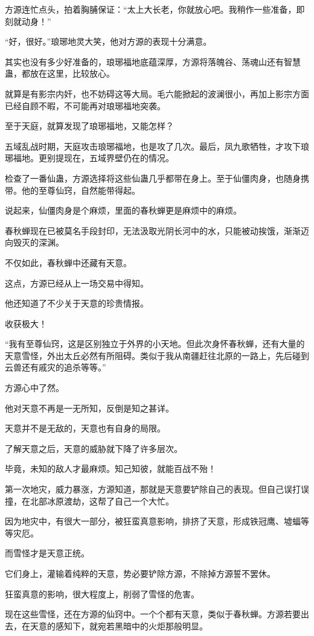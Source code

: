 \begin{this_body}
方源连忙点头，拍着胸脯保证：“太上大长老，你就放心吧。我稍作一些准备，即刻就动身！”

“好，很好。”琅琊地灵大笑，他对方源的表现十分满意。

其实也没有多少好准备的，琅琊福地底蕴深厚，方源将落魄谷、荡魂山还有智慧蛊，都放在这里，比较放心。

就算是有影宗内奸，也不妨碍这等大局。毛六能掀起的波澜很小，再加上影宗方面已经自顾不暇，不可能再对琅琊福地突袭。

至于天庭，就算发现了琅琊福地，又能怎样？

五域乱战时期，天庭攻击琅琊福地，也是攻了几次。最后，凤九歌牺牲，才攻下琅琊福地。更别提现在，五域界壁仍在的情况。

检查了一番仙蛊，方源选择将这些仙蛊几乎都带在身上。至于仙僵肉身，也随身携带。他的至尊仙窍，自然能带得起。

说起来，仙僵肉身是个麻烦，里面的春秋蝉更是麻烦中的麻烦。

春秋蝉现在已被莫名手段封印，无法汲取光阴长河中的水，只能被动挨饿，渐渐迈向毁灭的深渊。

不仅如此，春秋蝉中还藏有天意。

这点，方源已经从上一场交易中得知。

他还知道了不少关于天意的珍贵情报。

收获极大！

“我有至尊仙窍，这是区别独立于外界的小天地。但此次身怀春秋蝉，还有大量的天意雪怪，外出太丘必然有所阻碍。类似于我从南疆赶往北原的一路上，先后碰到云兽还有戚灾的追杀等等。”

方源心中了然。

他对天意不再是一无所知，反倒是知之甚详。

天意并不是无敌的，天意也有自身的局限。

了解天意之后，天意的威胁就下降了许多层次。

毕竟，未知的敌人才最麻烦。知己知彼，就能百战不殆！

第一次地灾，威力暴涨，方源知道，那就是天意要铲除自己的表现。但自己误打误撞，在北部冰原渡劫，这帮了自己一个大忙。

因为地灾中，有很大一部分，被狂蛮真意影响，排挤了天意，形成铁冠鹰、墟蝠等等灾厄。

而雪怪才是天意正统。

它们身上，灌输着纯粹的天意，势必要铲除方源，不除掉方源誓不罢休。

狂蛮真意的影响，很大程度上，削弱了雪怪的危害。

现在这些雪怪，还在方源的仙窍中。一个个都有天意，类似于春秋蝉。方源若要出去，在天意的感知下，就宛若黑暗中的火炬那般明显。


\end{this_body}
